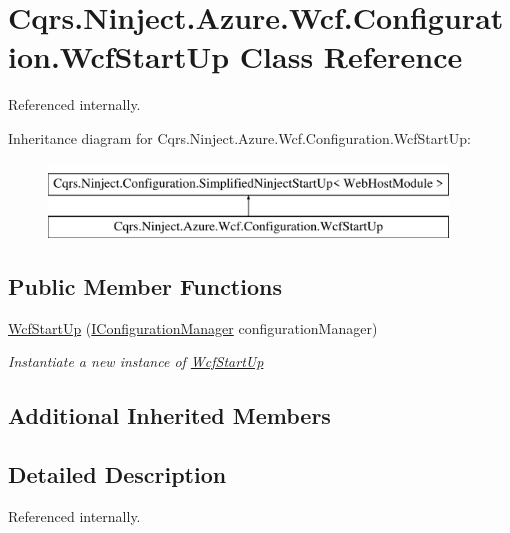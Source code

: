 \hypertarget{classCqrs_1_1Ninject_1_1Azure_1_1Wcf_1_1Configuration_1_1WcfStartUp}{}\section{Cqrs.\+Ninject.\+Azure.\+Wcf.\+Configuration.\+Wcf\+Start\+Up Class Reference}
\label{classCqrs_1_1Ninject_1_1Azure_1_1Wcf_1_1Configuration_1_1WcfStartUp}


Referenced internally.  


Inheritance diagram for Cqrs.\+Ninject.\+Azure.\+Wcf.\+Configuration.\+Wcf\+Start\+Up\+:\begin{figure}[H]
\begin{center}
\leavevmode
\includegraphics[height=2.000000cm]{classCqrs_1_1Ninject_1_1Azure_1_1Wcf_1_1Configuration_1_1WcfStartUp}
\end{center}
\end{figure}
\subsection*{Public Member Functions}
\begin{DoxyCompactItemize}
\item 
\hyperlink{classCqrs_1_1Ninject_1_1Azure_1_1Wcf_1_1Configuration_1_1WcfStartUp_a43968a1c4f997d56c2b6eb0a3b6e46a3_a43968a1c4f997d56c2b6eb0a3b6e46a3}{Wcf\+Start\+Up} (\hyperlink{interfaceCqrs_1_1Configuration_1_1IConfigurationManager}{I\+Configuration\+Manager} configuration\+Manager)
\begin{DoxyCompactList}\small\item\em Instantiate a new instance of \hyperlink{classCqrs_1_1Ninject_1_1Azure_1_1Wcf_1_1Configuration_1_1WcfStartUp}{Wcf\+Start\+Up} \end{DoxyCompactList}\end{DoxyCompactItemize}
\subsection*{Additional Inherited Members}


\subsection{Detailed Description}
Referenced internally. 



